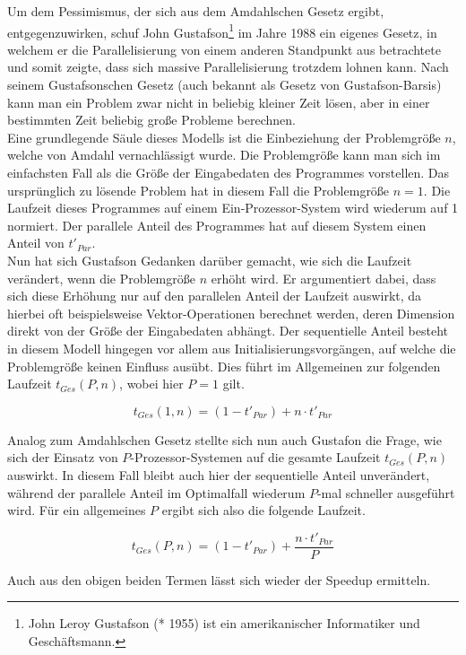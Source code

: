 \begin{description}
					Um dem Pessimismus, der sich aus dem Amdahlschen Gesetz ergibt, entgegenzuwirken, schuf John Gustafson\footnote{John Leroy Gustafson (* 1955) ist ein amerikanischer Informatiker und Geschäftsmann.\cite{JohnGustafsonWikipedia}} im Jahre 1988 ein eigenes Gesetz, in welchem er die Parallelisierung von einem anderen Standpunkt aus betrachtete und somit zeigte, dass sich massive Parallelisierung trotzdem lohnen kann. Nach seinem Gustafsonschen Gesetz (auch bekannt als Gesetz von Gustafson-Barsis) kann man ein Problem zwar nicht in beliebig kleiner Zeit lösen, aber in einer bestimmten Zeit beliebig große Probleme berechnen.\\
					Eine grundlegende Säule dieses Modells ist die Einbeziehung der Problemgröße $n$, welche von Amdahl vernachlässigt wurde. Die Problemgröße kann man sich im einfachsten Fall als die Größe der Eingabedaten des Programmes vorstellen. Das ursprünglich zu lösende Problem hat in diesem Fall die Problemgröße $n = 1$. Die Laufzeit dieses Programmes auf einem Ein-Prozessor-System wird wiederum auf 1 normiert. Der parallele Anteil des Programmes hat auf diesem System einen Anteil von $t'_{Par}$.\\
					Nun hat sich Gustafson Gedanken darüber gemacht, wie sich die Laufzeit verändert, wenn die Problemgröße $n$ erhöht wird. Er argumentiert dabei, dass sich diese Erhöhung nur auf den parallelen Anteil der Laufzeit auswirkt, da hierbei oft beispielsweise Vektor-Operationen berechnet werden, deren Dimension direkt von der Größe der Eingabedaten abhängt. Der sequentielle Anteil besteht in diesem Modell hingegen vor allem aus Initialisierungsvorgängen, auf welche die Problemgröße keinen Einfluss ausübt. Dies führt im Allgemeinen zur folgenden Laufzeit $t_{Ges}(P, n)$, wobei hier $P = 1$ gilt.
					
					\[ t_{Ges}(1, n) = (1 - t'_{Par}) + n \cdot t'_{Par} \]
					
					Analog zum Amdahlschen Gesetz stellte sich nun auch Gustafon die Frage, wie sich der Einsatz von $P$-Prozessor-Systemen auf die gesamte Laufzeit $t_{Ges}(P, n)$ auswirkt. In diesem Fall bleibt auch hier der sequentielle Anteil unverändert, während der parallele Anteil im Optimalfall wiederum $P$-mal schneller ausgeführt wird. Für ein allgemeines $P$ ergibt sich also die folgende Laufzeit.
					
					\[ t_{Ges}(P, n) = (1 - t'_{Par}) + \frac{n \cdot t'_{Par}}{P} \]
					
					Auch aus den obigen beiden Termen lässt sich wieder der Speedup ermitteln.
					

\end{description}
